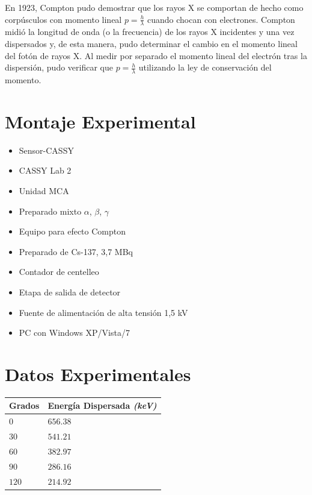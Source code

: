 \documentclass[letterpaper, 12pt]{article}
\newcommand{\bolditalic}[1]{\textbf{\textit{#1}}}
\begin{document}
En 1923, Compton pudo demostrar que los rayos X se
comportan de hecho como corpúsculos con momento lineal $p =
      \frac{h}{\lambda}$ cuando chocan con electrones. Compton
midió la longitud de onda (o la frecuencia) de los rayos X
incidentes y una vez dispersados y, de esta manera, pudo
determinar el cambio en el momento lineal del fotón de
rayos X. Al medir por separado el momento lineal del
electrón tras la dispersión, pudo verificar que $p =
      \frac{h}{\lambda}$ utilizando la ley de conservación del
momento.

\section{Montaje Experimental}

\begin{itemize}
      \item Sensor-CASSY
      \item CASSY Lab 2
      \item Unidad MCA
      \item Preparado mixto $\alpha$, $\beta$, $\gamma$
      \item Equipo para efecto Compton
      \item Preparado de Cs-137, 3,7 MBq
      \item Contador de centelleo
      \item Etapa de salida de detector
      \item Fuente de alimentación de alta tensión 1,5 kV
      \item PC con Windows XP/Vista/7
\end{itemize}

\section{Datos Experimentales}

\begin{table}[H]
      \begin{center}
            \begin{tabularx}{.5\linewidth}{|>{\centering\arraybackslash}X|>{\centering\arraybackslash}X|}
                  \hline
                  Grados & Energía Dispersada \bolditalic{(keV)} \\\hline
                  $0$    & $656.38$                              \\\hline
                  $30$   & $541.21$                              \\\hline
                  $60$   & $382.97$                              \\\hline
                  $90$   & $286.16$                              \\\hline
                  $120$  & $214.92$                              \\\hline

            \end{tabularx}
      \end{center}
\end{table}
\end{document}
